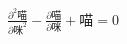 \documentclass{article}
\begin{document}
\begin{CJK}{UTF8}{bsmi}
$\frac{\partial^2\mbox{喵}}{\partial\mbox{咪}^2} - \frac{\partial\mbox{喵}}{\partial\mbox{咪}} + \mbox{喵} = 0$
\end{CJK}
\end{document}
